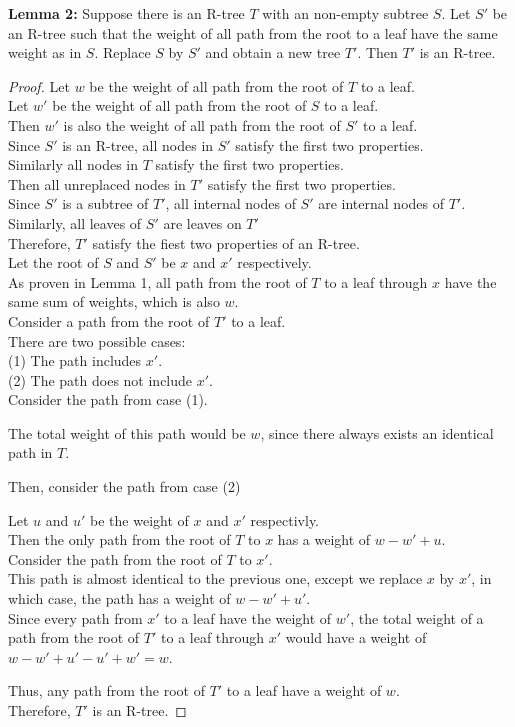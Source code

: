 \documentclass[10pt]{article}
\begin{document}
\begin{enumerate}
	\textbf{Lemma 2:} Suppose there is an R-tree $T$ with an non-empty subtree
		$S$. Let $S'$ be an R-tree such that the weight of all path from the
		root to a leaf have the same weight as in $S$. Replace $S$ by $S'$ and
		obtain a new tree $T'$. Then $T'$ is an R-tree. 
	\begin{proof}
		Let $w$ be the weight of all path from the root of $T$ to a leaf. \\
		Let $w'$ be the weight of all path from the root of $S$ to a leaf. \\
		Then $w'$ is also the weight of all path from the root of $S'$ to a
		leaf. \\
		Since $S'$ is an R-tree, all nodes in $S'$ satisfy the first two
		properties. \\
		Similarly all nodes in $T$ satisfy the first two properties. \\
		Then all unreplaced nodes in $T'$ satisfy the first two properties. \\
		Since $S'$ is a subtree of $T'$, all internal nodes of $S'$ are
		internal nodes of $T'$. \\
		Similarly, all leaves of $S'$ are leaves on $T'$ \\
		Therefore, $T'$ satisfy the fiest two properties of an R-tree. \\
		Let the root of $S$ and $S'$ be $x$ and $x'$ respectively. \\
		As proven in Lemma 1, all path from the root of $T$ to a leaf through
		$x$ have the same sum of weights, which is also $w$. \\
		Consider a path from the root of $T'$ to a leaf. \\
		There are two possible cases:  \\
		(1) The path includes $x'$. \\
		(2) The path does not include $x'$. \\
		Consider the path from case (1). 
		\begin{addmargin}[1em]{0em}
			The total weight of this path would be $w$, since there always
			exists an identical path in $T$. 
		\end{addmargin}
		Then, consider the path from case (2)
		\begin{addmargin}[1em]{0em}
			Let $u$ and $u'$ be the weight of $x$ and $x'$ respectivly. \\
			Then the only path from the root of $T$ to $x$ has a weight of
			$w-w'+u$. \\
			Consider the path from the root of $T$ to $x'$. \\
			This path is almost identical to the previous one, except we
			replace $x$ by $x'$, in which case, the path has a weight of
			$w-w'+u'$. \\
			Since every path from $x'$ to a leaf have the weight of $w'$, the
			total weight of a path from the root of $T'$ to a leaf through $x'$
			would have a weight of $w-w'+u' - u' + w' = w$. \\
		\end{addmargin}
		Thus, any path from the root of $T'$ to a leaf have a weight of $w$. \\
		Therefore, $T'$ is an R-tree.
	\end{proof}


\end{enumerate}
\end{document}
